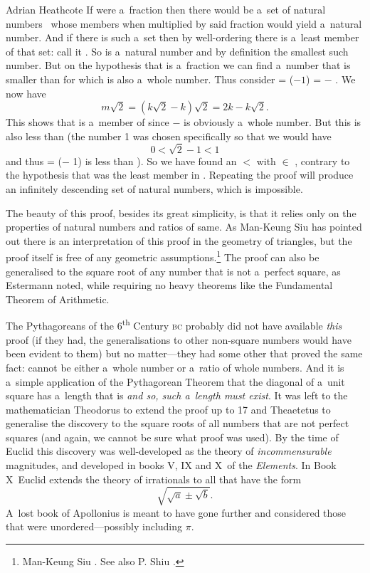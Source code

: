 \begin{artengenv}{Adrian Heathcote}
If \sqrtwo were a~fraction then there would be a~set of natural numbers~ whose members when multiplied by said fraction would yield a~natural number. And if there is such a~set then by well-ordering there is a~least member of that set: call it . So  is a~natural number and by definition the smallest such number. But on the hypothesis that \sqrtwo is a~fraction we can find a~number  that is smaller than  for which  is also a~whole number. Thus consider  = (\sqrtwo $- 1$) =  $-$ . We now have $$m\sqrt{2} = (k\sqrt{2} - k)\sqrt{2} = 2k - k\sqrt{2}.$$ This shows that  is a~member of  since  $-$  is obviously a~whole number. But this  is also less than   (the number 1 was chosen specifically so that we would have$$0 < \sqrt{2} - 1 < 1$$ and thus  = (\sqrtwo $-$ 1) is less than ). So we have found an  $<$  with  $\in$ , contrary to the hypothesis that  was the least member in . Repeating the proof will produce an infinitely descending set of natural numbers, which is impossible.

The beauty of this proof, besides its great simplicity, is that it relies only on the properties of natural numbers and ratios of same. As Man-Keung Siu has pointed out there is an interpretation of this proof in the geometry of triangles, but the proof itself is free of any geometric assumptions.\footnote{Man-Keung Siu \parencite*{siu_estermann_1998}. See also P. Shiu \parencite*{shiu_more_1999}.} The proof can also be generalised to the square root of any number that is not a~perfect square, as Estermann noted, while requiring no heavy theorems like the Fundamental Theorem of Arithmetic.

The Pythagoreans of the 6\textsuperscript{th} Century \textsc{bc} probably did not have available \textit{this} proof (if they had, the generalisations to other non-square numbers would have been evident to them) but no matter---they had some other that proved the same fact: \sqrtwo cannot be either a~whole number or a~ratio of whole numbers. And it is a~simple application of the Pythagorean Theorem that the diagonal of a~unit square has a~length that is \sqrtwo \emph{and so, such a~length \emph{must} exist}. It was left to the mathematician Theodorus to extend the proof up to 17 and Theaetetus to generalise the discovery to the square roots of all numbers that are not perfect squares (and again, we cannot be sure what proof was used). By the time of Euclid this discovery was well-developed as the theory of \textit{incommensurable} magnitudes, and developed in books V, IX and X~of the \textit{Elements}. In Book X~Euclid extends the theory of irrationals to all that have the form $$\sqrt{\sqrt{a} \pm \sqrt{b}}.$$ A~lost book of Apollonius is meant to have gone further and considered those that were unordered---possibly including $\pi$.


\end{artengenv}
